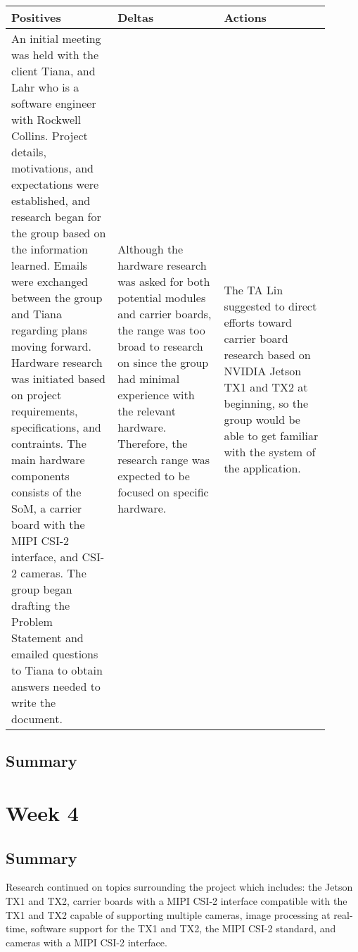 \documentclass[letterpaper,10pt,serif,draftclsnofoot,onecolumn,compsoc,titlepage]{IEEEtran}
\begin{document}
\begin{tabular}{|p{0.3\linewidth}|p{0.3\linewidth}|p{0.3\linewidth}|}
   \hline
   \textbf{Positives} & \textbf{Deltas} & \textbf{Actions}\\ 
   \hline
   An initial meeting was held with the client Tiana, and Lahr who is a software 
   engineer with Rockwell Collins. Project details, motivations, and expectations 
   were established, and research began for the group based on the information learned. 
   Emails were exchanged between the group and Tiana regarding plans moving forward. 
   Hardware research was initiated based on project requirements, specifications, and 
   contraints. The main hardware components consists of the SoM, a carrier board with 
   the MIPI CSI-2 interface, and CSI-2 cameras. 
   The group began drafting the Problem Statement and emailed questions 
   to Tiana to obtain answers needed to write the document. 
   & 
   Although the hardware research was asked for both potential modules and carrier boards, 
   the range was too broad to research on since the group had minimal experience with the relevant hardware. 
   Therefore, the research range was expected to be focused on specific hardware.
   & 
   The TA Lin suggested to direct efforts toward carrier board research based on NVIDIA Jetson TX1 and TX2 at beginning, so the group would be able to get familiar with the system of the application. \\
   \hline
\end{tabular}

\subsection{Summary}

\section{Week 4}

\subsection{Summary}

Research continued on topics surrounding the project which includes: the Jetson TX1 and 
TX2, carrier boards with a MIPI CSI-2 interface compatible with the TX1 and TX2 
capable of supporting multiple cameras, image processing at real-time, software support 
for the TX1 and TX2, the MIPI CSI-2 standard, and cameras with a MIPI CSI-2 interface. \\
\end{document}

